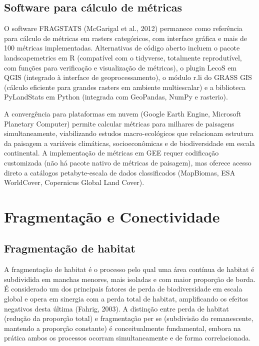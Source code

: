 \documentclass[
  portuguese,
  11pt,
  a4paper,
  open=any]{scrbook}
\begin{document}
\section{Software para cálculo de
métricas}\label{software-para-cuxe1lculo-de-muxe9tricas}

O software FRAGSTATS (McGarigal et al., 2012) permanece como referência
para cálculo de métricas em rasters categóricos, com interface gráfica e
mais de 100 métricas implementadas. Alternativas de código aberto
incluem o pacote landscapemetrics em R (compatível com o tidyverse,
totalmente reprodutível, com funções para verificação e visualização de
métricas), o plugin LecoS em QGIS (integrado à interface de
geoprocessamento), o módulo r.li do GRASS GIS (cálculo eficiente para
grandes rasters em ambiente multiescalar) e a biblioteca PyLandStats em
Python (integrada com GeoPandas, NumPy e rasterio).

A convergência para plataformas em nuvem (Google Earth Engine, Microsoft
Planetary Computer) permite calcular métricas para milhares de paisagens
simultaneamente, viabilizando estudos macro-ecológicos que relacionam
estrutura da paisagem a variáveis climáticas, socioeconômicas e de
biodiversidade em escala continental. A implementação de métricas em GEE
requer codificação customizada (não há pacote nativo de métricas de
paisagem), mas oferece acesso direto a catálogos petabyte-escala de
dados classificados (MapBiomas, ESA WorldCover, Copernicus Global Land
Cover).

\chapter{Fragmentação e Conectividade}\label{sec-fragmentacao}

\section{Fragmentação de habitat}\label{fragmentauxe7uxe3o-de-habitat}

A fragmentação de habitat é o processo pelo qual uma área contínua de
habitat é subdividida em manchas menores, mais isoladas e com maior
proporção de borda. É considerado um dos principais fatores de perda de
biodiversidade em escala global e opera em sinergia com a perda total de
habitat, amplificando os efeitos negativos desta última (Fahrig, 2003).
A distinção entre perda de habitat (redução da proporção total) e
fragmentação per se (subdivisão do remanescente, mantendo a proporção
constante) é conceitualmente fundamental, embora na prática ambos os
processos ocorram simultaneamente e de forma correlacionada.
\end{document}
